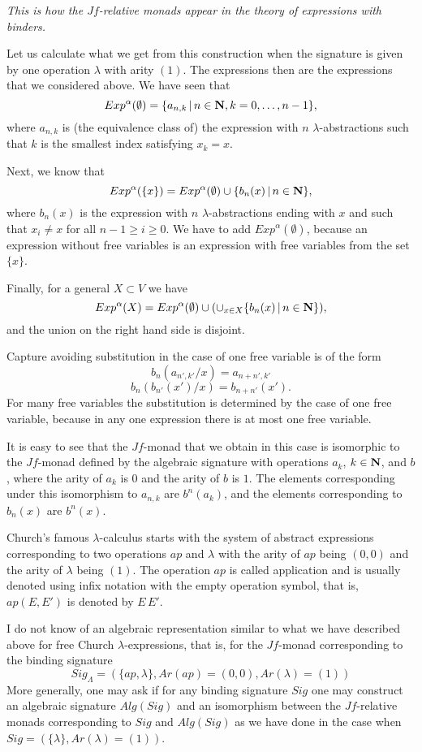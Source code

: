 \documentclass[12pt]{amsart}
\newcommand{\nn}{{\bf N\rm}}
\newcommand{\nat}{\nn}
\begin{document}
{\em This is how the $Jf$-relative monads appear in the theory of expressions with binders.}

Let us calculate what we get from this construction when the signature is given
by one operation $\lambda$ with arity $(1)$. The expressions then are the
expressions that we considered above. We have seen that
%
$$Exp^{\alpha}(\emptyset)=\{a_{n,k}\,|\,n\in\nat,k=0,\dots,n-1\},$$
%
where $a_{n,k}$ is (the equivalence class of) the expression with $n$
$\lambda$-abstractions such that $k$ is the smallest index satisfying $x_k=x$.

Next, we know that
%
$$Exp^{\alpha}(\{x\})=Exp^{\alpha}(\emptyset)\cup \{b_n(x)\,|\,n\in \nat\},$$
%
where $b_n(x)$ is the expression with $n$ $\lambda$-abstractions ending with
$x$ and such that $x_i\ne x$ for all $n-1\ge i\ge 0$. We have to add
$Exp^{\alpha}(\emptyset)$, because an expression without free variables is an
expression with free variables from the set $\{x\}$.

Finally, for a general $X\subset V$ we have
%
$$Exp^{\alpha}(X)=Exp^{\alpha}(\emptyset)\cup (\cup_{x\in X}\{b_n(x)\,|\,n\in \nat\}),$$
%
and the union on the right hand side is disjoint. 

Capture avoiding substitution in the case of one free variable is of the form
%
$$b_n(a_{n',k'}/x)=a_{n+n',k'}$$
$$b_n(b_{n'}(x')/x)=b_{n+n'}(x').$$
%
For many free variables the substitution is determined by the case of one free
variable, because in any one expression there is at most one free variable.

It is easy to see that the $Jf$-monad that we obtain in this case is isomorphic
to the $Jf$-monad defined by the algebraic signature with operations $a_k$,
$k\in\nat$, and $b$, where the arity of $a_k$ is $0$ and the arity of $b$ is
$1$. The elements corresponding under this isomorphism to $a_{n,k}$ are
$b^n(a_k)$, and the elements corresponding to $b_n(x)$ are $b^n(x)$.

Church's famous $\lambda$-calculus starts with the system of abstract
expressions corresponding to two operations $ap$ and $\lambda$ with the arity
of $ap$ being $(0,0)$ and the arity of $\lambda$ being $(1)$.  The operation $ap$ is
called application and is usually denoted using infix notation with the
empty operation symbol, that is, $ap(E,E')$ is denoted by $E\,E'$.

I do not know of an algebraic representation similar to what we have described
above for free Church $\lambda$-expressions, that is, for the $Jf$-monad
corresponding to the binding signature
%
$$Sig_{\Lambda}=(\{ap,\lambda\}, Ar(ap)=(0,0), Ar(\lambda)=(1))$$
%
More generally, one may ask if for any binding signature $Sig$ one may
construct an algebraic signature $Alg(Sig)$ and an isomorphism between the
$Jf$-relative monads corresponding to $Sig$ and $Alg(Sig)$ as we have done in
the case when $Sig=(\{\lambda\},Ar(\lambda)=(1))$.
\end{document}
